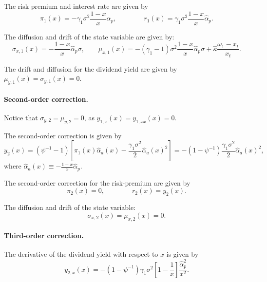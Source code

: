 \documentclass[11pt,english]{article}
\begin{document}
The risk premium and interest rate are given by
\begin{equation}
    \pi_1(x) = -\gamma_1 \sigma^2  \frac{1-x}{x} \hat{\alpha}_p, \qquad \qquad 
    r_1(x) = \gamma_1 \sigma^2  \frac{1-x}{x} \hat{\alpha}_p.
\end{equation}

The diffusion and drift of the state variable are given by:
\begin{equation}
    \sigma_{x,1}(x) = -\frac{1-x}{x} \hat{\alpha}_p \sigma, \qquad \mu_{x,1}(x) = -(\gamma_1 -1)\sigma^2 \frac{1-x}{x} \hat{\alpha}_p \sigma + \hat{\kappa} \frac{\omega_1 - x_t}{x_t}.
\end{equation}

The drift and diffusion for the dividend yield are given by $\mu_{y,1}(x) = \sigma_{y,1}(x) = 0$.

\paragraph{Second-order correction.} 
Notice that $\sigma_{y,2} = \mu_{y,2} = 0$, as $y_{1,x}(x)= y_{1,xx}(x) = 0$. 

The second-order correction is given by
\begin{equation}
    y_{2}(x) = (\psi^{-1}-1) \left[ \pi_1(x) \hat{\alpha}_{a}(x) - \frac{\gamma_1 \sigma^2}{2} \hat{\alpha}_{a}(x)^2 \right] = -(1-\psi^{-1})\frac{\gamma_1\sigma^2 }{2} \hat{\alpha}_{a}(x)^2,
\end{equation}
where $\hat{\alpha}_{a}(x) \equiv -\frac{1-x}{x} \hat{\alpha}_{p}$.

The second-order correction for the risk-premium are given by
\begin{equation}
    \pi_2(x) = 0, \qquad \qquad
    r_2(x) = y_2(x).
\end{equation}

The diffusion and drift of the state variable:
\begin{equation}
    \sigma_{x,2}(x) = \mu_{x,2}(x) = 0.
\end{equation}

\paragraph{Third-order correction.} The derivative of the dividend yield with respect to $x$ is given by
\begin{equation}
    y_{2,x}(x) = -(1-\psi^{-1}) \gamma_1 \sigma^2 \left[ 1 -\frac{1}{x}\right] \frac{\hat{\alpha}_p^2}{x^2}.
\end{equation}
\end{document}
